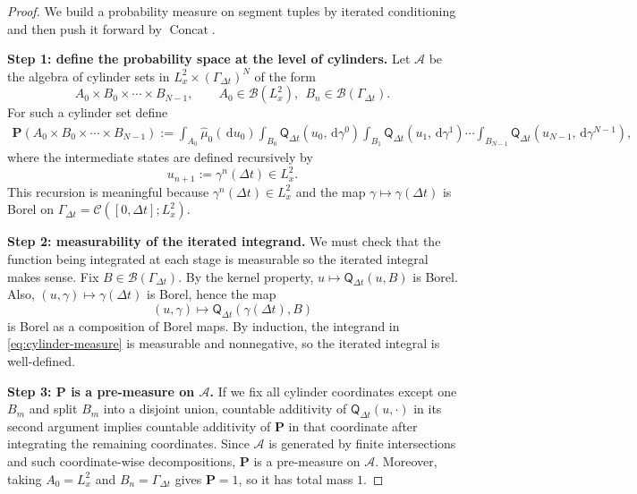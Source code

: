 \documentclass{article}
\numberwithin{equation}{section}
\theoremstyle{plain}
\theoremstyle{definition}
\theoremstyle{remark}
\newcommand{\Ccal}{\mathcal{C}}
\newcommand{\dd}{\,\mathrm{d}}
\DeclareMathOperator{\Concat}{Concat}
\begin{document}
\begin{proof}
We build a probability measure on segment tuples by iterated conditioning and then push it forward by $\Concat$.

\smallskip
\noindent\textbf{Step 1: define the probability space at the level of cylinders.}
Let $\mathcal A$ be the algebra of cylinder sets in
$L^2_x\times(\Gamma_{\Delta t})^N$ of the form
\[
A_0\times B_0\times\cdots\times B_{N-1},
\qquad A_0\in\mathcal B(L^2_x),\ \ B_n\in\mathcal B(\Gamma_{\Delta t}).
\]
For such a cylinder set define
\begin{equation}\label{eq:cylinder-measure}
\begin{aligned}
\mathbf P(A_0\times B_0\times\cdots\times B_{N-1})
:=
\int_{A_0}\widehat\mu_0(\dd u_0)
\int_{B_0}\mathsf Q_{\Delta t}(u_0,\dd\gamma^0)
\int_{B_1}\mathsf Q_{\Delta t}(u_1,\dd\gamma^1)\cdots
\int_{B_{N-1}}\mathsf Q_{\Delta t}(u_{N-1},\dd\gamma^{N-1}),
\end{aligned}
\end{equation}
where the intermediate states are defined recursively by
\begin{equation}\label{eq:state-recursion}
u_{n+1}:=\gamma^n(\Delta t)\in L^2_x.
\end{equation}
This recursion is meaningful because $\gamma^n(\Delta t)\in L^2_x$ and the map $\gamma\mapsto\gamma(\Delta t)$ is Borel on
$\Gamma_{\Delta t}=\Ccal([0,\Delta t];L^2_x)$.

\smallskip
\noindent\textbf{Step 2: measurability of the iterated integrand.}
We must check that the function being integrated at each stage is measurable so the iterated integral makes sense.
Fix $B\in\mathcal B(\Gamma_{\Delta t})$. By the kernel property, $u\mapsto \mathsf Q_{\Delta t}(u,B)$ is Borel.
Also, $(u,\gamma)\mapsto \gamma(\Delta t)$ is Borel, hence the map
\[
(u,\gamma)\mapsto \mathsf Q_{\Delta t}(\gamma(\Delta t),B)
\]
is Borel as a composition of Borel maps. By induction, the integrand in \eqref{eq:cylinder-measure} is measurable and nonnegative,
so the iterated integral is well-defined.

\smallskip
\noindent\textbf{Step 3: $\mathbf P$ is a pre-measure on $\mathcal A$.}
If we fix all cylinder coordinates except one $B_m$ and split $B_m$ into a disjoint union,
countable additivity of $\mathsf Q_{\Delta t}(u,\cdot)$ in its second argument implies countable additivity of $\mathbf P$ in that
coordinate after integrating the remaining coordinates. Since $\mathcal A$ is generated by finite intersections and such
coordinate-wise decompositions, $\mathbf P$ is a pre-measure on $\mathcal A$.
Moreover, taking $A_0=L^2_x$ and $B_n=\Gamma_{\Delta t}$ gives $\mathbf P=1$, so it has total mass $1$.


\end{proof}
\end{document}
